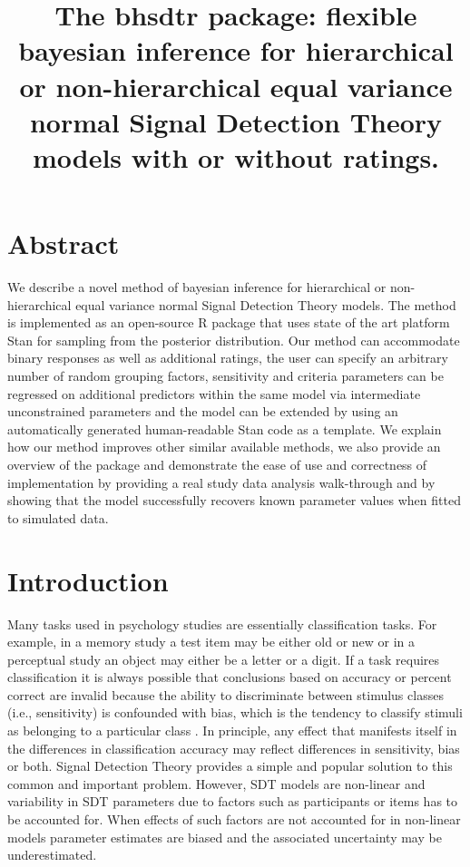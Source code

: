 \documentclass[oneside,a4paper]{article}
\title{The bhsdtr package: flexible bayesian inference for
  hierarchical or non-hierarchical equal variance normal Signal
  Detection Theory models with or without ratings.}
\begin{document}
\maketitle
\tableofcontents{}

\section{Abstract}

We describe a novel method of bayesian inference for hierarchical or
non-hierarchical equal variance normal Signal Detection Theory
models. The method is implemented as an open-source R package that
uses state of the art platform Stan for sampling from the posterior
distribution. Our method can accommodate binary responses as well as
additional ratings, the user can specify an arbitrary number of random
grouping factors, sensitivity and criteria parameters can be regressed
on additional predictors within the same model via intermediate
unconstrained parameters and the model can be extended by using an
automatically generated human-readable Stan code as a template. We
explain how our method improves other similar available methods, we
also provide an overview of the package and demonstrate the ease of
use and correctness of implementation by providing a real study data
analysis walk-through and by showing that the model successfully
recovers known parameter values when fitted to simulated data.

\section{Introduction}

Many tasks used in psychology studies are essentially classification
tasks. For example, in a memory study a test item may be either old or
new or in a perceptual study an object may either be a letter or a
digit. If a task requires classification it is always possible that
conclusions based on accuracy or percent correct are invalid because
the ability to discriminate between stimulus classes (i.e.,
sensitivity) is confounded with bias, which is the tendency to
classify stimuli as belonging to a particular class
\cite{GreenSwets66}. In principle, any effect that manifests itself in
the differences in classification accuracy may reflect differences in
sensitivity, bias or both. Signal Detection Theory provides a simple
and popular solution to this common and important problem. However,
SDT models are non-linear and variability in SDT parameters due to
factors such as participants or items has to be accounted for. When
effects of such factors are not accounted for in non-linear models
parameter estimates are biased and the associated uncertainty may be
underestimated.
\end{document}
